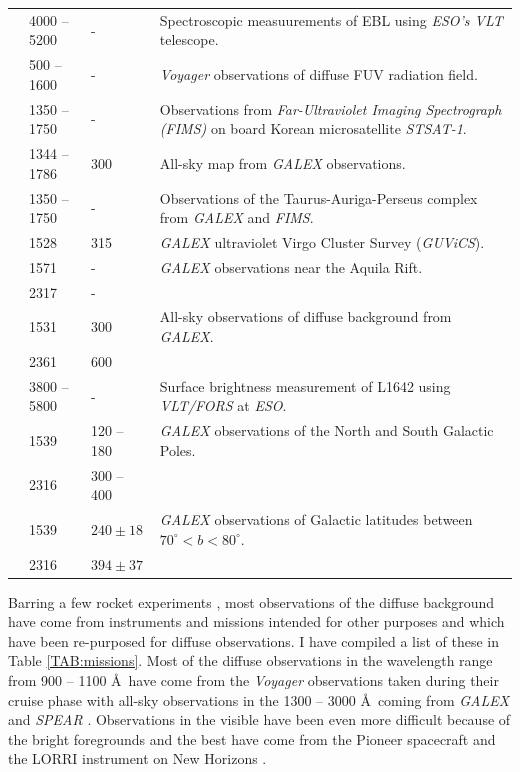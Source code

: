\documentclass{iau}
\newcommand{\galex}{{\it GALEX }}
\newcommand{\voyager}{{\it Voyager }}
\begin{document}
\begin{longtable}{lllp{9cm}}
 \citet{Mattila2012} & 4000 -- 5200 & - & Spectroscopic measuurements of EBL using \textit{ESO's VLT} telescope. \\ 
 \citet{Murthyvoy_all} & 500 -- 1600 & - & \textit{Voyager} observations of diffuse FUV radiation field. \\
 \citet{Jo2012} & 1350 -- 1750 & - & Observations from \textit{Far-Ultraviolet Imaging Spectrograph (FIMS)} on board Korean microsatellite \textit{STSAT-1}. \\
 \citet{Hamden2013} & 1344 -- 1786 & 300 & All-sky map from \textit{GALEX} observations. \\
 \citet{Lim2013} & 1350 -- 1750 & - & Observations of the Taurus-Auriga-Perseus complex from \textit{GALEX} and \textit{FIMS}. \\
\citet{Boissier2015} & 1528 & 315 & \textit{GALEX} ultraviolet Virgo Cluster Survey (\textit{GUViCS}). \\
 \citet{Jyothy2015} & 1571 & -  & \textit{GALEX} observations near the Aquila Rift. \\ 
  & 2317 & - & \\
 \citet{Murthy2016} & 1531 & 300 & All-sky observations of diffuse background from \textit{GALEX}. \\
 & 2361 & 600 & \\
 \cite{Mattila2017II} & 3800 -- 5800 & - & Surface brightness measurement of L1642 using \textit{VLT/FORS} at \textit{ESO}. \\
 \citet{Akshaya2018} & 1539 & 120 -- 180 & \textit{GALEX} observations of the North and South Galactic Poles. \\
  & 2316 & 300 -- 400 & \\
 \citet{Akshaya2019} & 1539 & $240 \pm 18$ & \textit{GALEX} observations of Galactic latitudes between $70^{\circ}<b<80^{\circ}$. \\
  & 2316 & $394 \pm 37$ & \\
\hline
\end{longtable}

Barring a few rocket experiments \citep{Bowyer1991, Henry1991}, most observations of the diffuse background have come from instruments and missions intended for other purposes and which have been re-purposed for diffuse observations. I have compiled a list of these in Table \ref{TAB:missions}. Most of the diffuse observations in the wavelength range from 900 -- 1100 \AA\ have come from the \voyager observations taken during their cruise phase \citep{Murthy_voy, Murthyvoy_all} with all-sky observations in the 1300 -- 3000 \AA\ coming from \galex \citep{Murthy_galex_data2010, Hamden2013, Murthy2016} and {\it SPEAR} \citep{Edelstein2006, Seon2011}. Observations in the visible have been even more difficult because of the bright foregrounds and the best have come from the Pioneer spacecraft \citep{Toller_EBL, Gordon_Pioneer1998, Matsuoka2011} and the LORRI instrument on New Horizons \citep{Zemcov_lorri_2017}.
\end{document}
